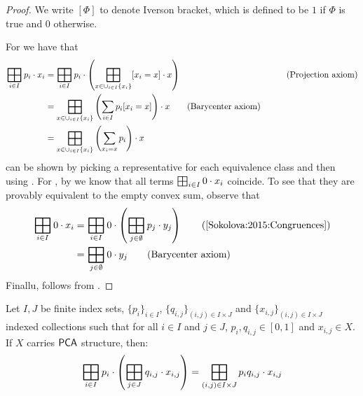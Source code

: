 \begin{proof}
    We write $[\Phi]$ to denote Iverson bracket, which is defined to be $1$ if $\Phi$ is true and $0$ otherwise.
    
    For  we have that
    \begin{align*}
        \bigboxplus_{i \in I} p_i \cdot x_i &= \bigboxplus_{i \in I} p_i \cdot \left( \bigboxplus_{x \in \cup_{i \in I} \{x_i\}} [x_i = x] \cdot  x \right) &\tag{Projection axiom}\\
        &= \bigboxplus_{x \in \cup_{i \in I} \{x_i\}} \left( \sum_{i \in I} p_i[x_i = x] \right) \cdot x \tag{Barycenter axiom} \\
        &=  \bigboxplus_{x \in \cup_{i \in I} \{x_i\} } \left(\sum_{x_i = x} p_i\right) \cdot x
    \end{align*}
     can be shown by picking a representative for each equivalence class and then using . For , by \cite[Lemma~3.4]{Sokolova:2015:Congruences} we know that all terms $\bigboxplus_{i \in I} 0 \cdot x_i$ coincide. To see that they are provably equivalent to the empty convex sum, observe that
    \begin{align*}
        \bigboxplus_{i \in I} 0 \cdot x_i &= \bigboxplus_{i \in I} 0 \cdot \left(\bigboxplus_{j \in \emptyset} p_j \cdot y_j\right)\tag{\cite[Lemma~3.4]{Sokolova:2015:Congruences}}\\
        &= \bigboxplus_{j \in \emptyset} 0 \cdot y_j \tag{Barycenter axiom}\\
    \end{align*}
    Finallu,  follows from \cite[Lemma~3.4]{Sokolova:2015:Congruences}.
\end{proof}
\begin{lemma}\label{lem:flattening_convex_sums}
    Let $I, J$ be finite index sets, $\{p_i\}_{i \in I}$, $\{q_{i,j}\}_{(i,j) \in I\times J}$ and $\{x_{i,j}\}_{(i,j) \in I \times J}$ indexed collections such that for all $i \in I$ and $j \in J$, $p_i, q_{i,j} \in [0,1]$ and $x_{i,j} \in X$. If $X$ carries ${\mathsf{PCA}}$ structure, then:
    $$\bigboxplus_{i \in I} p_i \cdot \left(\bigboxplus_{j \in J} q_{i,j} \cdot x_{i,j}\right) = \bigboxplus_{(i,j) \in I \times J} p_iq_{i,j} \cdot x_{i,j}$$
\end{lemma}
